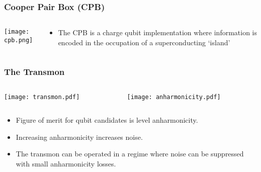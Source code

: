 \documentclass{beamer}
\begin{document}
\begin{frame}
    \frametitle{Cooper Pair Box (CPB)}

    \begin{columns}[T]
        \begin{column}{0.5\linewidth}
            \texttt{[image: cpb.png]}
        \end{column}
        \begin{column}{0.5\linewidth}
            \begin{itemize}

                \item The CPB is a charge qubit implementation where 
                    information is encoded in the occupation of a 
                    superconducting `island'

            \end{itemize}
        \end{column}
    \end{columns}

\end{frame}
\begin{frame}
    \frametitle{The Transmon}

    \begin{columns}[T]

        \begin{column}{0.35\linewidth}
    \texttt{[image: transmon.pdf]}
        \end{column}

        \begin{column}{0.5\linewidth}
    \texttt{[image: anharmonicity.pdf]}
        \end{column}

    \end{columns}

        \begin{itemize}

            \item Figure of merit for qubit candidates is level 
                    anharmonicity. 
            \item Increasing anharmonicity increases noise.
            \item The transmon can be operated in a regime where noise 
                    can be suppressed with small anharmonicity losses. 
                    
        \end{itemize}

\end{frame}
\end{document}
